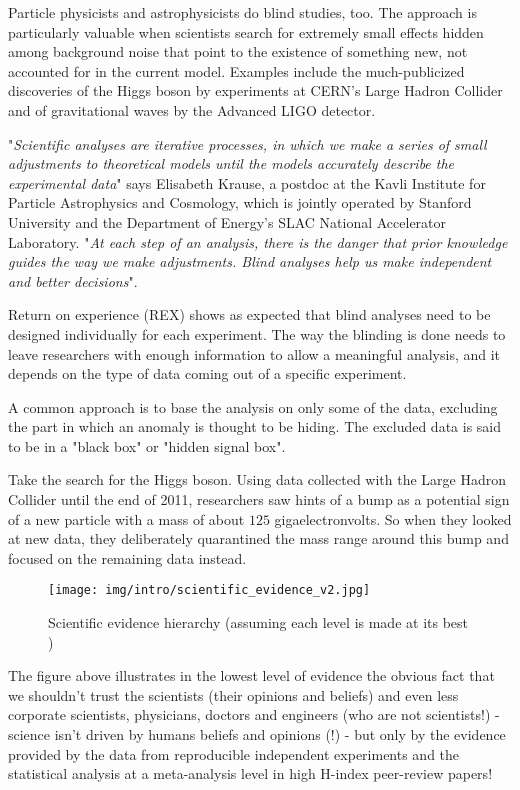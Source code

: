 	Particle physicists and astrophysicists do blind studies, too. The approach is particularly valuable when scientists search for extremely small effects hidden among background noise that point to the existence of something new, not accounted for in the current model. Examples include the much-publicized discoveries of the Higgs boson by experiments at CERN's Large Hadron Collider and of gravitational waves by the Advanced LIGO detector.
	
	"\textit{Scientific analyses are iterative processes, in which we make a series of small adjustments to theoretical models until the models accurately describe the experimental data}" says Elisabeth Krause, a postdoc at the Kavli Institute for Particle Astrophysics and Cosmology, which is jointly operated by Stanford University and the Department of Energy's SLAC National Accelerator Laboratory. "\textit{At each step of an analysis, there is the danger that prior knowledge guides the way we make adjustments. Blind analyses help us make independent and better decisions}".
	
	Return on experience (REX) shows as expected that blind analyses need to be designed individually for each experiment. The way the blinding is done needs to leave researchers with enough information to allow a meaningful analysis, and it depends on the type of data coming out of a specific experiment.

	A common approach is to base the analysis on only some of the data, excluding the part in which an anomaly is thought to be hiding. The excluded data is said to be in a "black box" or "hidden signal box".

	Take the search for the Higgs boson. Using data collected with the Large Hadron Collider until the end of 2011, researchers saw hints of a bump as a potential sign of a new particle with a mass of about $125$ gigaelectronvolts. So when they looked at new data, they deliberately quarantined the mass range around this bump and focused on the remaining data instead.
	\label{evidence levels chart}
	\begin{figure}[H]
		\centering
		\texttt{[image: img/intro/scientific\_evidence\_v2.jpg]}
		\caption[Scientific evidence hierarchy]{Scientific evidence hierarchy (assuming each level is made \og at its best \fg{})}
	\end{figure}
	
	The figure above illustrates in the lowest level of evidence the obvious fact that we shouldn't trust the scientists (their opinions and beliefs) and even less corporate scientists, physicians, doctors and engineers (who are not scientists!) - science isn't driven by humans beliefs and opinions (!) - but only by the evidence provided by the data from reproducible independent experiments and the statistical analysis at a meta-analysis level in high H-index peer-review papers!
	
